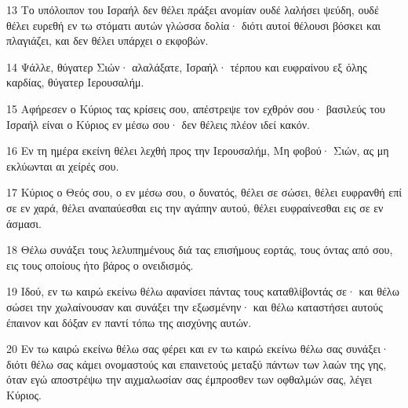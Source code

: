 \par 13 Το υπόλοιπον του Ισραήλ δεν θέλει πράξει ανομίαν ουδέ λαλήσει ψεύδη, ουδέ θέλει ευρεθή εν τω στόματι αυτών γλώσσα δολία· διότι αυτοί θέλουσι βόσκει και πλαγιάζει, και δεν θέλει υπάρχει ο εκφοβών.
\par 14 Ψάλλε, θύγατερ Σιών· αλαλάξατε, Ισραήλ· τέρπου και ευφραίνου εξ όλης καρδίας, θύγατερ Ιερουσαλήμ.
\par 15 Αφήρεσεν ο Κύριος τας κρίσεις σου, απέστρεψε τον εχθρόν σου· βασιλεύς του Ισραήλ είναι ο Κύριος εν μέσω σου· δεν θέλεις πλέον ιδεί κακόν.
\par 16 Εν τη ημέρα εκείνη θέλει λεχθή προς την Ιερουσαλήμ, Μη φοβού· Σιών, ας μη εκλύωνται αι χείρές σου.
\par 17 Κύριος ο Θεός σου, ο εν μέσω σου, ο δυνατός, θέλει σε σώσει, θέλει ευφρανθή επί σε εν χαρά, θέλει αναπαύεσθαι εις την αγάπην αυτού, θέλει ευφραίνεσθαι εις σε εν άσμασι.
\par 18 Θέλω συνάξει τους λελυπημένους διά τας επισήμους εορτάς, τους όντας από σου, εις τους οποίους ήτο βάρος ο ονειδισμός.
\par 19 Ιδού, εν τω καιρώ εκείνω θέλω αφανίσει πάντας τους καταθλίβοντάς σε· και θέλω σώσει την χωλαίνουσαν και συνάξει την εξωσμένην· και θέλω καταστήσει αυτούς έπαινον και δόξαν εν παντί τόπω της αισχύνης αυτών.
\par 20 Εν τω καιρώ εκείνω θέλω σας φέρει και εν τω καιρώ εκείνω θέλω σας συνάξει· διότι θέλω σας κάμει ονομαστούς και επαινετούς μεταξύ πάντων των λαών της γης, όταν εγώ αποστρέψω την αιχμαλωσίαν σας έμπροσθεν των οφθαλμών σας, λέγει Κύριος.


